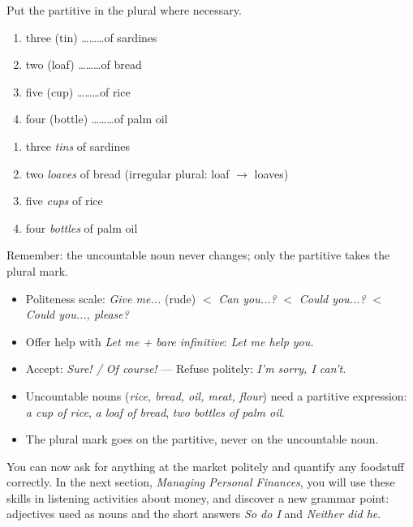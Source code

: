 \documentclass[11pt]{article}
\begin{document}
\begin{exercice}
Put the partitive in the plural where necessary.
\begin{enumerate}
\item three (tin) \ldots\ldots\ldots of sardines
\item two (loaf) \ldots\ldots\ldots of bread
\item five (cup) \ldots\ldots\ldots of rice
\item four (bottle) \ldots\ldots\ldots of palm oil
\end{enumerate}
\end{exercice}

\begin{corrige}[Exercice 3]
\begin{enumerate}
\item three \emph{tins} of sardines
\item two \emph{loaves} of bread (irregular plural: loaf $\rightarrow$ loaves)
\item five \emph{cups} of rice
\item four \emph{bottles} of palm oil
\end{enumerate}
Remember: the uncountable noun never changes; only the partitive takes the plural mark.
\end{corrige}

\begin{aretenir}
\begin{itemize}
\item Politeness scale: \emph{Give me...} (rude) $<$ \emph{Can you...?} $<$ \emph{Could you...?} $<$ \emph{Could you..., please?}
\item Offer help with \emph{Let me + bare infinitive}: \emph{Let me help you.}
\item Accept: \emph{Sure! / Of course!} — Refuse politely: \emph{I'm sorry, I can't.}
\item Uncountable nouns (\emph{rice, bread, oil, meat, flour}) need a partitive expression: \emph{a cup of rice}, \emph{a loaf of bread}, \emph{two bottles of palm oil}.
\item The plural mark goes on the partitive, never on the uncountable noun.
\end{itemize}
\end{aretenir}

You can now ask for anything at the market politely and quantify any foodstuff correctly. In the next section, \emph{Managing Personal Finances}, you will use these skills in listening activities about money, and discover a new grammar point: adjectives used as nouns and the short answers \emph{So do I} and \emph{Neither did he}.
\end{document}
